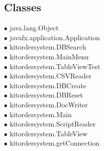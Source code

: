 \documentclass[
11pt, %
a4paper, %
oneside, %
headinclude,footinclude, %
BCOR5mm, %
]{scrartcl}
\begin{document}
\begin{appendices}
{\subsection*{Classes}
{\raggedright
\hspace{0.0cm} $\bullet$ java.lang.Object {\tiny {}} \\
\hspace{1.0cm} $\bullet$ javafx.application.Application {\tiny {}} \\
\hspace{2.0cm} $\bullet$ kitordersystem.DBSearch {\tiny {}} \\
\hspace{2.0cm} $\bullet$ kitordersystem.MainMenu {\tiny {}} \\
\hspace{2.0cm} $\bullet$ kitordersystem.TableViewTest {\tiny {}} \\
\hspace{1.0cm} $\bullet$ kitordersystem.CSVReader {\tiny {}} \\
\hspace{1.0cm} $\bullet$ kitordersystem.DBCreate {\tiny {}} \\
\hspace{1.0cm} $\bullet$ kitordersystem.DBReset {\tiny {}} \\
\hspace{1.0cm} $\bullet$ kitordersystem.DocWriter {\tiny {}} \\
\hspace{1.0cm} $\bullet$ kitordersystem.Main {\tiny {}} \\
\hspace{1.0cm} $\bullet$ kitordersystem.ScriptReader {\tiny {}} \\
\hspace{1.0cm} $\bullet$ kitordersystem.TableView {\tiny {}} \\
\hspace{1.0cm} $\bullet$ kitordersystem.getConnection {\tiny {}} \\
}
}

\end{appendices}
\end{document}
